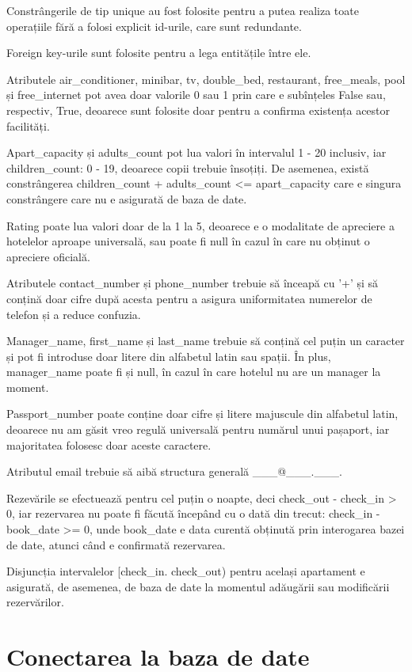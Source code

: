 \documentclass[12pt]{article}
\begin{document}
Constrângerile de tip unique au fost folosite pentru a putea realiza toate operațiile fără a folosi explicit id-urile, care sunt redundante.

Foreign key-urile sunt folosite pentru a lega entitățile între ele.

Atributele air\_conditioner, minibar, tv, double\_bed, restaurant, free\_meals, pool și free\_internet pot avea doar valorile 0 sau 1 prin care e subînțeles False sau, respectiv, True, deoarece sunt folosite doar pentru a confirma existența acestor facilități.

Apart\_capacity și adults\_count pot lua valori în intervalul 1 - 20 inclusiv, iar children\_count: 0 - 19, deoarece copii trebuie însoțiți. De asemenea, există constrângerea children\_count + adults\_count <= apart\_capacity care e singura constrângere care nu e asigurată de baza de date.

Rating poate lua valori doar de la 1 la 5, deoarece e o modalitate de apreciere a hotelelor aproape universală, sau poate fi null în cazul în care nu obținut o apreciere oficială.

Atributele contact\_number și phone\_number trebuie să înceapă cu '+' și să conțină doar cifre după acesta pentru a asigura uniformitatea numerelor de telefon și a reduce confuzia.

Manager\_name, first\_name și last\_name trebuie să conțină cel puțin un caracter și pot fi introduse doar litere din alfabetul latin sau spații. În plus, manager\_name poate fi și null, în cazul în care
hotelul nu are un manager la moment.

Passport\_number poate conține doar cifre și litere majuscule din alfabetul latin, deoarece nu am găsit vreo regulă universală pentru numărul unui pașaport, iar majoritatea folosesc doar aceste caractere.

Atributul email trebuie să aibă structura generală \_\_\_@\_\_\_.\_\_\_.

Rezevările se efectuează pentru cel puțin o noapte, deci check\_out - check\_in > 0, iar rezervarea nu poate fi făcută începând cu o dată din trecut: check\_in - book\_date >= 0, unde book\_date e data curentă obținută prin interogarea bazei de date, atunci când e confirmată rezervarea.

Disjuncția intervalelor [check\_in. check\_out) pentru același apartament e asigurată, de asemenea, de baza de date la momentul adăugării sau modificării rezervărilor.

\section{Conectarea la baza de date}
\end{document}
